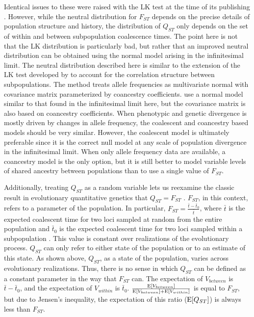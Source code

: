Identical issues to these were raised with the LK test at the time of its
publishing \citep{Nei1975,Robertson1975}. However, while the neutral
distribution for $F_{ST}$ depends on the precise details of population structure
and history, the distribution of $Q_{ST}$ only depends on the set of within and
between subpopulation coalescence times. The point here is not that the LK
distribution is particularly bad, but rather that an improved neutral
distribution can be obtained using the normal model arising in the infinitesimal
limit. The neutral distribution described here is similar to the extension of
the LK test developed by \citet{Bonhomme2010} to account for the correlation
structure between subpopulations. The \citet{Bonhomme2010} method treats allele
frequencies as multivariate normal with covariance matrix parameterized by
coancestry coefficients. \citet{Ovaskainen2011} use a normal model similar to
that found in the infinitesimal limit here, but the covariance matrix is also
based on coancestry coefficients. When phenotypic and genetic divergence is
mostly driven by changes in allele frequency, the coalescent and coancestry
based models should be very similar. However, the coalescent model is ultimately
preferable since it is the correct null model at any scale of population
divergence in the infinitesimal limit. When only allele frequency data are
available, a coancestry model is the only option, but it is still better to
model variable levels of shared ancestry between populations than to use a
single value of $F_{ST}$.

Additionally, treating $Q_{ST}$ as a random variable lets us reexamine the
classic result in evolutionary quantitative genetics that $Q_{ST}=F_{ST}$
\citep{Whitlock1999}. $F_{ST}$, in this context, refers to a parameter of the
population. In particular, $F_{ST} = \frac{\bar{t} - \bar{t}_0}{\bar{t}}$, where
$\bar{t}$ is the expected coalescent time for two loci sampled at random from
the entire population and $\bar{t}_0$ is the expected coalescent time for two
loci sampled within a subpopulation \citep{Slatkin1991}. This value is constant
over realizations of the evolutionary process. $Q_{ST}$ can only refer to either
state of the population or to an estimate of this state. As shown above,
$Q_{ST}$, as a state of the population, varies across evolutionary realizations.
Thus, there is no sense in which $Q_{ST}$ can be defined as a constant parameter
in the way that $F_{ST}$ can. The expectation of $V_{between}$ is $\bar{t} -
\bar{t}_0$, and the expectation of $V_{within}$ is $\bar{t}_0$.
$\frac{\mathrm{E}[V_{between}]}{\mathrm{E}[V_{between}] + \mathrm{E}[V_{within}]}$ is equal to $F_{ST}$,
but due to Jensen's inequality, the expectation of this ratio ($\mathrm{E}[Q_{ST}]$) is
always less than $F_{ST}$.

